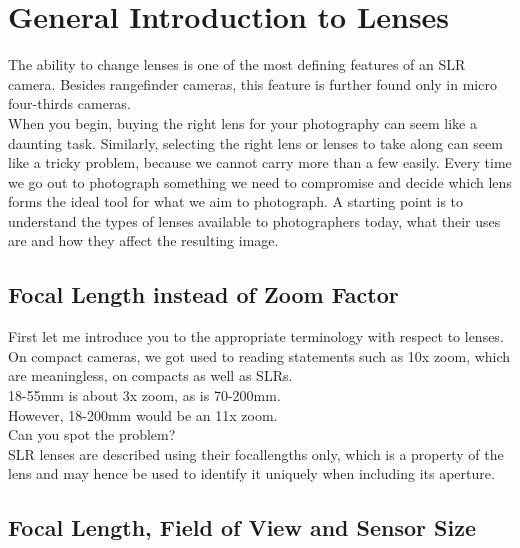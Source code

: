 \section{General Introduction to Lenses}
\label{sec:General-Introdcution-Lenses}

The ability to change lenses is one of the most defining features of an \gls{SLR} camera. Besides \gls{rangefinder} cameras, this feature is further found only in micro four-thirds cameras.
\\[\baselineskip]
When you begin, buying the right lens for your photography can seem like a daunting task. Similarly, selecting the right lens or lenses to take along can seem like a tricky problem, because we cannot carry more than a few easily. Every time we go out to photograph something we need to compromise and decide which lens forms the ideal tool for what we aim to photograph. A starting point is to understand the types of lenses available to photographers today, what their uses are and how they affect the resulting image.

\subsection{Focal Length instead of Zoom Factor}

First let me introduce you to the appropriate terminology with respect to lenses. On compact cameras, we got used to reading statements such as 10x zoom, which are meaningless, on compacts as well as \glspl{SLR}.
\\
18-55mm is about 3x zoom, as is 70-200mm.
\\
However, 18-200mm would be an 11x zoom.
\\
Can you spot the problem?
\\[\baselineskip]
\gls{SLR} lenses are described using their \glspl{focallength} only, which is a property of the lens and may hence be used to identify it uniquely when including its \gls{aperture}.

\subsection{Focal Length, Field of View and Sensor Size}


